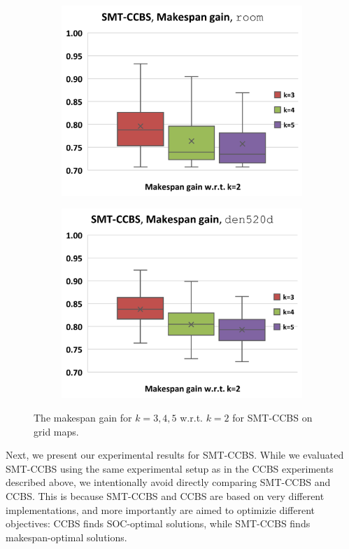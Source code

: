 \documentclass[review]{elsarticle}
\newcommand\roni[1]{\nb{\textbf{Roni:}}{green}{#1}}
\newcommand{\ccbs}{\ac{CCBS}\xspace}
\newcommand{\smtccbs}{SMT-CCBS\xspace}
\begin{document}
\begin{figure}[t]
    \begin{subfigure}
        \centering
        \includegraphics[width=0.45\linewidth]{mapfr-Makespan-plot-smtcbs-room.pdf}
    \end{subfigure}\hspace{0.025\linewidth}
    \begin{subfigure}
        \centering
        \includegraphics[width=0.45\linewidth]{mapfr-Makespan-plot-smtcbs-den520d.pdf}
    \end{subfigure}%
    
\caption{The makespan gain for $k=3,4,5$ w.r.t. $k=2$ for \smtccbs on grid maps.}
\label{fig:results-smtcbs-makespan-grids}
\end{figure}



Next, we present our experimental results for \smtccbs. While we evaluated \smtccbs using the same experimental setup as in the \ccbs experiments described above, we intentionally avoid directly comparing \smtccbs and \ccbs. 
This is because \smtccbs and \ccbs are based on very different implementations, and more importantly are aimed to optimizie different objectives: \ccbs finds SOC-optimal solutions, while \smtccbs finds makespan-optimal solutions. 
\end{document}
